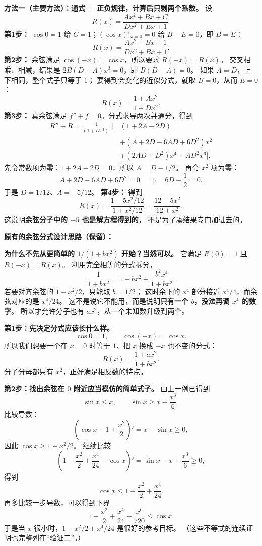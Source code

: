 \begin{proofbox}
\medskip
\noindent\textbf{方法一（主要方法）：通式 + 正负规律，计算后只剩两个系数。}
设
\[
 R(x)=\frac{Ax^2+Bx+C}{Dx^2+Ex+1}.
\]
\textbf{第1步：} $\cos0=1$ 给 $C=1$；$(\cos x)'_{x=0}=0$ 给 $B-E=0$，即 $B=E$：
\[
 R(x)=\frac{Ax^2+Bx+1}{Dx^2+Bx+1}.
\]
\textbf{第2步：} 余弦满足 $\cos(-x)=\cos x$，所以要求 $R(-x)=R(x)$。
交叉相乘、相减，结果是 $2B(D-A)x^3=0$，即 $B(D-A)=0$。
如果 $A=D$，上下相同，整个式子只等于 $1$；
要得到会变化的近似分式，就取 $B=0$，从而 $E=0$：
\[
 R(x)=\frac{1+Ax^2}{1+Dx^2}.
\]
\textbf{第3步：} 真余弦满足 $f''+f=0$。分式求导两次并通分，得到
\[
 \begin{aligned}
 R''+R=\frac{1}{(1+Dx^2)^3}\bigl[\,&(1+2A-2D)\\
 &+(A+2D-6AD+6D^2)x^2\\
 &+(2AD+D^2)x^4+AD^2x^6\bigr].
 \end{aligned}
\]
先令常数项为零：$1+2A-2D=0$，所以 $A=D-1/2$。
再令 $x^2$ 项为零：
\[
 A+2D-6AD+6D^2=0
 \quad\Longrightarrow\quad 6D-\frac12=0.
\]
于是 $D=1/12$、$A=-5/12$。
\textbf{第4步：} 得到
\[
 \boxed{R(x)=\frac{1-5x^2/12}{1+x^2/12}
 =\frac{12-5x^2}{12+x^2}}.
\]
这说明\textbf{余弦分子中的 $-5$ 也是解方程得到的}，
不是为了凑结果专门加进去的。

\noindent\textbf{原有的余弦分式设计思路（保留）：}


\textbf{为什么不先从更简单的 $1/(1+bx^2)$ 开始？当然可以。}
它满足 $R(0)=1$ 且 $R(-x)=R(x)$。
利用完全相等的分式拆分，
\[
 \frac1{1+bx^2}=1-bx^2+\frac{b^2x^4}{1+bx^2}.
\]
若要对齐余弦的 $1-x^2/2$，只能取 $b=1/2$；
这时余下的 $x^4$ 部分接近 $x^4/4$，而余弦对应的是 $x^4/24$。
这不是说它不能用，而是说明\textbf{只有一个 $b$，没法再调 $x^4$ 的数字}。
所以才允许分子也有 $ax^2$，从一个未知数升级到两个。

\textbf{第1步：先决定分式应该长什么样。}
\[
 \cos0=1,\qquad \cos(-x)=\cos x.
\]
所以我们想要一个在 $x=0$ 时等于 $1$、把 $x$ 换成 $-x$ 也不变的分式：
\[
 R(x)=\frac{1+ax^2}{1+bx^2}.
\]
分子分母都只有 $x^2$，正好满足相反数的特点。

\textbf{第2步：找出余弦在 $0$ 附近应当模仿的简单式子。}
由上一例已得到
\[
 \sin x\le x,
 \qquad \sin x\ge x-\frac{x^3}{6}.
\]
比较导数：
\[
 \left(\cos x-1+\frac{x^2}{2}\right)'=x-\sin x\ge0,
\]
因此 $\cos x\ge1-x^2/2$。
继续比较
\[
 \left(1-\frac{x^2}{2}+\frac{x^4}{24}-\cos x\right)'
 =\sin x-x+\frac{x^3}{6}\ge0,
\]
得到
\[
 \cos x\le1-\frac{x^2}{2}+\frac{x^4}{24}.
\]
再多比较一步导数，可以得到下界
\[
 1-\frac{x^2}{2}+\frac{x^4}{24}-\frac{x^6}{720}\le\cos x.
\]
于是当 $x$ 很小时，$1-x^2/2+x^4/24$ 是很好的参考目标。
（这些不等式的连续证明也完整列在“验证二”。）


\end{proofbox}
